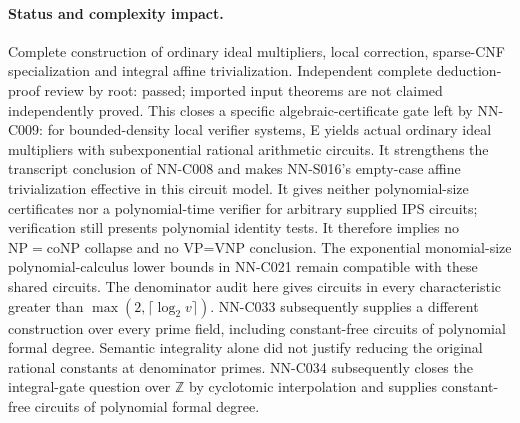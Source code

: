 \paragraph{Status and complexity impact.}
Complete construction of ordinary ideal multipliers, local correction, sparse-CNF specialization and integral affine trivialization. Independent complete deduction-proof review by root: passed; imported input theorems are not claimed independently proved. This closes a specific algebraic-certificate gate left by NN-C009: for bounded-density local verifier systems, E yields actual ordinary ideal multipliers with subexponential rational arithmetic circuits. It strengthens the transcript conclusion of NN-C008 and makes NN-S016's empty-case affine trivialization effective in this circuit model. It gives neither polynomial-size certificates nor a polynomial-time verifier for arbitrary supplied IPS circuits; verification still presents polynomial identity tests. It therefore implies no $\mathrm{NP}=\mathrm{coNP}$ collapse and no VP=VNP conclusion. The exponential monomial-size polynomial-calculus lower bounds in NN-C021 remain compatible with these shared circuits. The denominator audit here gives circuits in every characteristic greater than $\max(2,\lceil\log_2 v\rceil)$. NN-C033 subsequently supplies a different construction over every prime field, including constant-free circuits of polynomial formal degree. Semantic integrality alone did not justify reducing the original rational constants at denominator primes. NN-C034 subsequently closes the integral-gate question over $\mathbb Z$ by cyclotomic interpolation and supplies constant-free circuits of polynomial formal degree.

